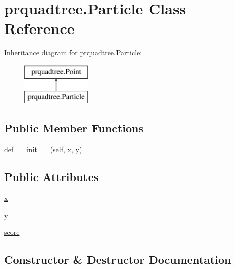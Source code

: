 \section{prquadtree.\+Particle Class Reference}
\label{classprquadtree_1_1Particle}
Inheritance diagram for prquadtree.\+Particle\+:\begin{figure}[H]
\begin{center}
\leavevmode
\includegraphics[height=2.000000cm]{classprquadtree_1_1Particle}
\end{center}
\end{figure}
\subsection*{Public Member Functions}
\begin{DoxyCompactItemize}
\item 
def \hyperlink{classprquadtree_1_1Particle_a4508876870d2813145a26fb581ce06f4}{\+\_\+\+\_\+init\+\_\+\+\_\+} (self, \hyperlink{classprquadtree_1_1Particle_a749ee47de3358225c48e7b8d4dc85ded}{x}, \hyperlink{classprquadtree_1_1Particle_ab4bcb8c94d6976d2050749590ad41210}{y})
\end{DoxyCompactItemize}
\subsection*{Public Attributes}
\begin{DoxyCompactItemize}
\item 
\hyperlink{classprquadtree_1_1Particle_a749ee47de3358225c48e7b8d4dc85ded}{x}
\item 
\hyperlink{classprquadtree_1_1Particle_ab4bcb8c94d6976d2050749590ad41210}{y}
\item 
\hyperlink{classprquadtree_1_1Particle_a9fc6fbbd51a3dc21b0dc2531c6c6ff1b}{score}
\end{DoxyCompactItemize}


\subsection{Constructor \& Destructor Documentation}
